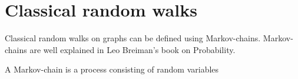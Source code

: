 \section{Classical random walks}

Classical random walks on graphs can be defined using Markov-chains. Markov-chains
are well explained in Leo Breiman's book on Probability\cite{breiman_probability_1992}.

 A Markov-chain is a process consisting of random variables
